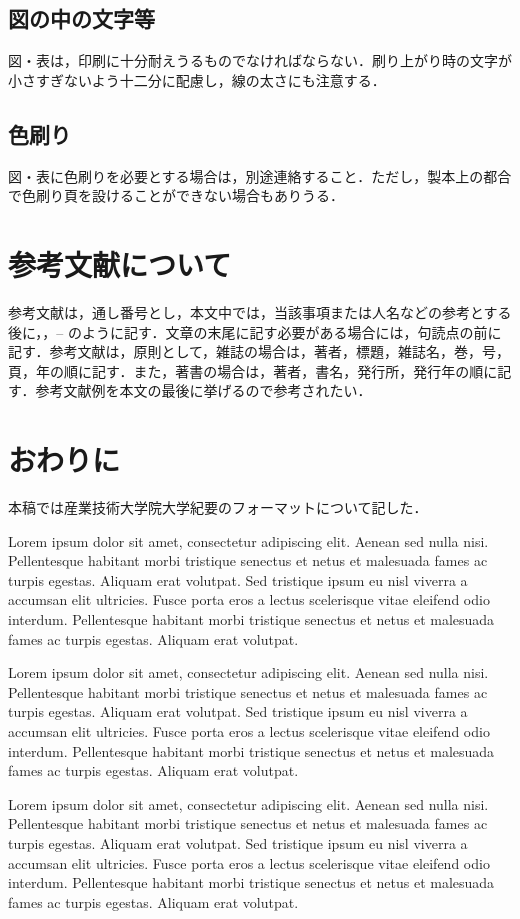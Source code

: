 \documentclass[a4j,9pt,twoside,twocolumn]{jsarticle}
\begin{document}
\subsection{図の中の文字等}
 図・表は，印刷に十分耐えうるものでなければならない．刷り上がり時の文字が小さすぎないよう十二分に配慮し，線の太さにも注意する．

\subsection{色刷り}
図・表に色刷りを必要とする場合は，別途連絡すること．ただし，製本上の都合で色刷り頁を設けることができない場合もありうる．

\section{参考文献について}
参考文献は，通し番号とし，本文中では，当該事項または人名などの参考とする
後に，\cite{TRA96HuHaCo}，\cite{SICE02Yo}--\cite{Asa02Ar}
のように記す．文章の末尾に記す必要がある場合には，句読点の前に記す．参考文献は，原則として，雑誌の場合は，著者，標題，雑誌名，巻，号，頁，年の順に記す．また，著書の場合は，著者，書名，発行所，発行年の順に記す．参考文献例を本文の最後に挙げるので参考されたい．

\section{おわりに}
本稿では産業技術大学院大学紀要のフォーマットについて記した．

Lorem ipsum dolor sit amet, consectetur adipiscing elit. Aenean sed
nulla nisi. Pellentesque habitant morbi tristique senectus et netus et malesuada
fames ac turpis egestas. Aliquam erat volutpat. Sed tristique ipsum eu nisl
viverra a accumsan elit ultricies. Fusce porta eros a lectus scelerisque vitae
eleifend odio interdum. Pellentesque habitant morbi tristique senectus et netus
et malesuada fames ac turpis egestas. Aliquam erat volutpat.

Lorem ipsum dolor sit amet, consectetur adipiscing elit. Aenean sed
nulla nisi. Pellentesque habitant morbi tristique senectus et netus et malesuada
fames ac turpis egestas. Aliquam erat volutpat. Sed tristique ipsum eu nisl
viverra a accumsan elit ultricies. Fusce porta eros a lectus scelerisque vitae
eleifend odio interdum. Pellentesque habitant morbi tristique senectus et netus
et malesuada fames ac turpis egestas. Aliquam erat volutpat.

Lorem ipsum dolor sit amet, consectetur adipiscing elit. Aenean sed
nulla nisi. Pellentesque habitant morbi tristique senectus et netus et malesuada
fames ac turpis egestas. Aliquam erat volutpat. Sed tristique ipsum eu nisl
viverra a accumsan elit ultricies. Fusce porta eros a lectus scelerisque vitae
eleifend odio interdum. Pellentesque habitant morbi tristique senectus et netus
et malesuada fames ac turpis egestas. Aliquam erat volutpat.
\end{document}
